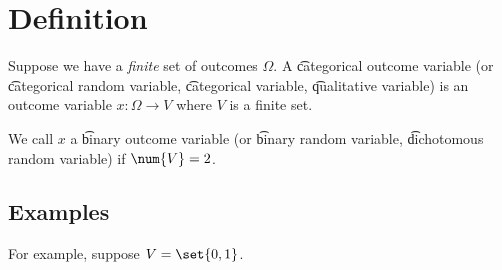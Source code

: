 

\section*{Definition}

Suppose we have a \textit{finite} set of outcomes $\Omega $.
A \t{categorical outcome variable} (or \t{categorical random variable}, \t{categorical variable}, \t{qualitative variable}) is an outcome variable $x: \Omega  \to V$ where $V$ is a finite set.

We call $x$ a \t{binary outcome variable} (or \t{binary random variable}, \t{dichotomous random variable}) if $\num{V} = 2$.

\subsection*{Examples}

For example, suppose $V = \set{0,1}$.

\blankpage
